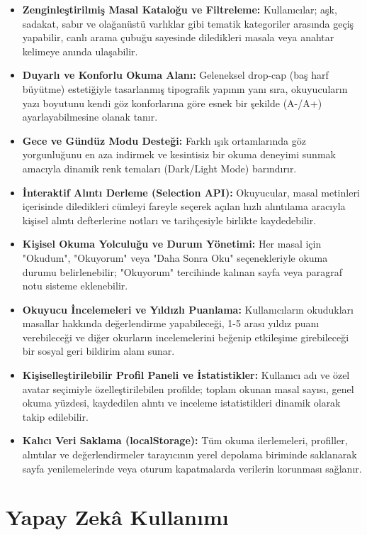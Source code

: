 \documentclass[12pt,a4paper]{article}
\begin{document}
\begin{itemize}
    \item \textbf{Zenginleştirilmiş Masal Kataloğu ve Filtreleme:} Kullanıcılar; aşk, sadakat, sabır ve olağanüstü varlıklar gibi tematik kategoriler arasında geçiş yapabilir, canlı arama çubuğu sayesinde diledikleri masala veya anahtar kelimeye anında ulaşabilir.
    \item \textbf{Duyarlı ve Konforlu Okuma Alanı:} Geleneksel drop-cap (baş harf büyütme) estetiğiyle tasarlanmış tipografik yapının yanı sıra, okuyucuların yazı boyutunu kendi göz konforlarına göre esnek bir şekilde (A-/A+) ayarlayabilmesine olanak tanır.
    \item \textbf{Gece ve Gündüz Modu Desteği:} Farklı ışık ortamlarında göz yorgunluğunu en aza indirmek ve kesintisiz bir okuma deneyimi sunmak amacıyla dinamik renk temaları (Dark/Light Mode) barındırır.
    \item \textbf{İnteraktif Alıntı Derleme (Selection API):} Okuyucular, masal metinleri içerisinde diledikleri cümleyi fareyle seçerek açılan hızlı alıntılama aracıyla kişisel alıntı defterlerine notları ve tarihçesiyle birlikte kaydedebilir.
    \item \textbf{Kişisel Okuma Yolculuğu ve Durum Yönetimi:} Her masal için "Okudum", "Okuyorum" veya "Daha Sonra Oku" seçenekleriyle okuma durumu belirlenebilir; "Okuyorum" tercihinde kalınan sayfa veya paragraf notu sisteme eklenebilir.
    \item \textbf{Okuyucu İncelemeleri ve Yıldızlı Puanlama:} Kullanıcıların okudukları masallar hakkında değerlendirme yapabileceği, 1-5 arası yıldız puanı verebileceği ve diğer okurların incelemelerini beğenip etkileşime girebileceği bir sosyal geri bildirim alanı sunar.
    \item \textbf{Kişiselleştirilebilir Profil Paneli ve İstatistikler:} Kullanıcı adı ve özel avatar seçimiyle özelleştirilebilen profilde; toplam okunan masal sayısı, genel okuma yüzdesi, kaydedilen alıntı ve inceleme istatistikleri dinamik olarak takip edilebilir.
    \item \textbf{Kalıcı Veri Saklama (localStorage):} Tüm okuma ilerlemeleri, profiller, alıntılar ve değerlendirmeler tarayıcının yerel depolama biriminde saklanarak sayfa yenilemelerinde veya oturum kapatmalarda verilerin korunması sağlanır.
\end{itemize}


\section{Yapay Zekâ Kullanımı}
\end{document}
